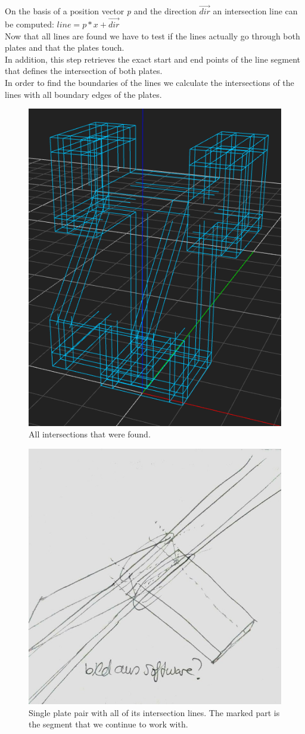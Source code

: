 \documentclass[../ClassicThesis.tex]{subfiles}
\begin{document}
On the basis of a position vector \emph{p} and the direction $\vec{dir}$ an intersection line can be computed: $ line = p*x + \vec{dir}$
\\
Now that all lines are found we have to test if the lines actually go through both plates and that the plates touch. \\
In addition, this step retrieves the exact start and end points of the line segment that defines the intersection of both plates.\\
In order to find the boundaries of the lines we calculate the intersections of the lines with all boundary edges of the plates.\\
\begin{figure}[!ht]
\centering
\includegraphics[width=.5\columnwidth]{Images/HeadAllBoundaries.png}
\caption{All intersections that were found. }
\end{figure}

\begin{figure}[!ht]
\centering
\includegraphics[width=.5\columnwidth]{Images/06-1-graph-fourIntersectionLines.jpg}
\caption{Single plate pair with all of its intersection lines. The marked part is the segment that we continue to work with.}
\end{figure}
\end{document}
